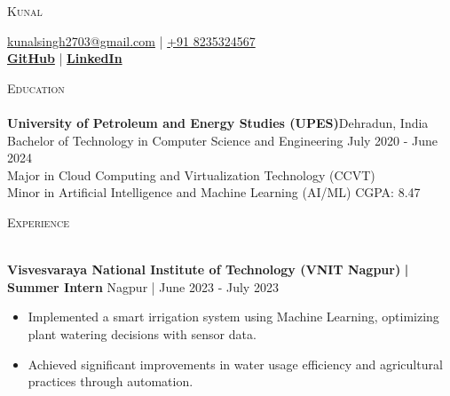 \documentclass[a4paper]{article}
\newcommand{\lineunder} {
    \vspace*{-8pt} \\
    \hspace*{-18pt} \hrulefill \\
}
\newcommand{\header} [1] {
    {\hspace*{-18pt}\vspace*{6pt} \textsc{#1}}
    \vspace*{-6pt} \lineunder
}
\begin{document}
    \vspace*{-40pt}


%
%
  \vspace*{-2pt}
  \begin{center}
    {\Huge \scshape {Kunal}}\\
    \vspace*{2pt}
    
    \vspace*{2pt}
    \href{mailto:kunalsingh2703@gmail.com}{kunalsingh2703@gmail.com} | \href{tel:+91 8235324567}{+91 8235324567}\\
    \vspace*{2pt}
    \small{\textbf{\href{https://github.com/Kunal2703}{GitHub}} | \textbf{\href{https://www.linkedin.com/in/kunal27}{LinkedIn}}}\\
  \end{center}

    \vspace{-6mm}
      \header{Education}
      \vspace{0mm}
      \textbf{University of Petroleum and Energy Studies (UPES)}\hfill Dehradun, India\\
Bachelor of Technology in Computer Science and Engineering \hfill July 2020 - June 2024\\
{\small Major in Cloud Computing and Virtualization Technology (CCVT)}\\
{\small Minor in Artificial Intelligence and Machine Learning (AI/ML) \hfill CGPA: 8.47}\\
\vspace{2mm}

    \vspace{-2mm}
      \header{Experience}
      \vspace{-0.5mm}

\textbf{Visvesvaraya National Institute of Technology (VNIT Nagpur)}\textbf{ | Summer Intern} \hfill Nagpur | June 2023 - July 2023\\
          \vspace{-2.5mm}
\begin{itemize} \itemsep -3pt
\item  Implemented a smart irrigation system using Machine Learning, optimizing plant watering decisions with sensor data.
\item  Achieved significant improvements in water usage efficiency and agricultural practices through automation.
\end{itemize}
\end{document}
